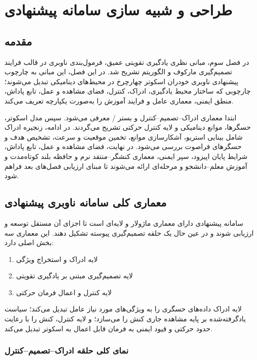 \chapter{طراحی و  شبیه سازی سامانه پیشنهادی}
\section{مقدمه}
\label{sec:chapter4_intro}

در فصل سوم، مبانی نظری یادگیری تقویتی عمیق، فرمول‌بندی ناوبری در قالب فرایند تصمیم‌گیری مارکوف و الگوریتم  تشریح شد. در این فصل، این مبانی به چارچوب پیشنهادی ناوبری خودران اسکوتر چهارچرخ در محیط‌های دینامیکی تبدیل می‌شوند؛ چارچوبی که ساختار محیط یادگیری، ادراک، کنترل، فضای مشاهده و عمل، تابع پاداش، منطق ایمنی، معماری عامل و فرایند آموزش را به‌صورت یکپارچه تعریف می‌کند.

ابتدا معماری ادراک--تصمیم--کنترل و بستر / معرفی می‌شود. سپس مدل اسکوتر، حسگرها، موانع دینامیکی و لایه کنترل حرکتی تشریح می‌گردند. در ادامه، زنجیره ادراک شامل بینایی استریو، آشکارسازی موانع، تخمین موقعیت و سرعت، تشخیص هدف و حسگرهای فراصوت بررسی می‌شود. در نهایت، فضای مشاهده و عمل، تابع پاداش، شرایط پایان اپیزود، سپر ایمنی، معماری کنشگر--منتقد نرم و حافظه بلند کوتاه‌مدت%
و آموزش معلم--دانشجو و مرحله‌ای ارائه می‌شوند تا مبنای ارزیابی فصل‌های بعد فراهم شود.


\section{معماری کلی سامانه ناوبری پیشنهادی}
\label{sec:proposed_navigation_architecture}

سامانه پیشنهادی دارای معماری ماژولار و لایه‌ای است تا اجزای آن مستقل توسعه و ارزیابی شوند و در عین حال یک حلقه تصمیم‌گیری پیوسته تشکیل دهند. این معماری سه بخش اصلی دارد:
\begin{enumerate}
	\item لایه ادراک و استخراج ویژگی
	\item لایه تصمیم‌گیری مبتنی بر یادگیری تقویتی
	\item لایه کنترل و اعمال فرمان حرکتی
\end{enumerate}
لایه ادراک داده‌های حسگری را به ویژگی‌های مورد نیاز عامل تبدیل می‌کند؛ سیاست یادگرفته‌شده بر پایه مشاهده جاری کنش را می‌سازد؛ و لایه کنترل، کنش را با رعایت حدود حرکتی و قیود ایمنی به فرمان قابل اعمال به اسکوتر تبدیل می‌کند.

\subsection{نمای کلی حلقه ادراک--تصمیم--کنترل}
\label{subsec:perception_decision_control_loop}

